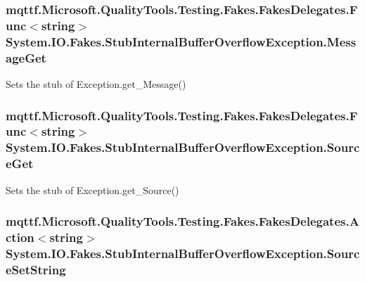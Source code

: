 \hypertarget{class_system_1_1_i_o_1_1_fakes_1_1_stub_internal_buffer_overflow_exception_a68a9b09afca7b908bd20649af18bdd46}{
\subsubsection[{Message\-Get}]{\setlength{\rightskip}{0pt plus 5cm}mqttf.\-Microsoft.\-Quality\-Tools.\-Testing.\-Fakes.\-Fakes\-Delegates.\-Func$<$string$>$ System.\-I\-O.\-Fakes.\-Stub\-Internal\-Buffer\-Overflow\-Exception.\-Message\-Get}}\label{class_system_1_1_i_o_1_1_fakes_1_1_stub_internal_buffer_overflow_exception_a68a9b09afca7b908bd20649af18bdd46}


Sets the stub of Exception.\-get\-\_\-\-Message()

\hypertarget{class_system_1_1_i_o_1_1_fakes_1_1_stub_internal_buffer_overflow_exception_ae6d23560336c7f54a2a6d47c05b1b0a2}{
\subsubsection[{Source\-Get}]{\setlength{\rightskip}{0pt plus 5cm}mqttf.\-Microsoft.\-Quality\-Tools.\-Testing.\-Fakes.\-Fakes\-Delegates.\-Func$<$string$>$ System.\-I\-O.\-Fakes.\-Stub\-Internal\-Buffer\-Overflow\-Exception.\-Source\-Get}}\label{class_system_1_1_i_o_1_1_fakes_1_1_stub_internal_buffer_overflow_exception_ae6d23560336c7f54a2a6d47c05b1b0a2}


Sets the stub of Exception.\-get\-\_\-\-Source()

\hypertarget{class_system_1_1_i_o_1_1_fakes_1_1_stub_internal_buffer_overflow_exception_a529643b0aac5e4c1170444eb77ca8e5f}{
\subsubsection[{Source\-Set\-String}]{\setlength{\rightskip}{0pt plus 5cm}mqttf.\-Microsoft.\-Quality\-Tools.\-Testing.\-Fakes.\-Fakes\-Delegates.\-Action$<$string$>$ System.\-I\-O.\-Fakes.\-Stub\-Internal\-Buffer\-Overflow\-Exception.\-Source\-Set\-String}}\label{class_system_1_1_i_o_1_1_fakes_1_1_stub_internal_buffer_overflow_exception_a529643b0aac5e4c1170444eb77ca8e5f}


